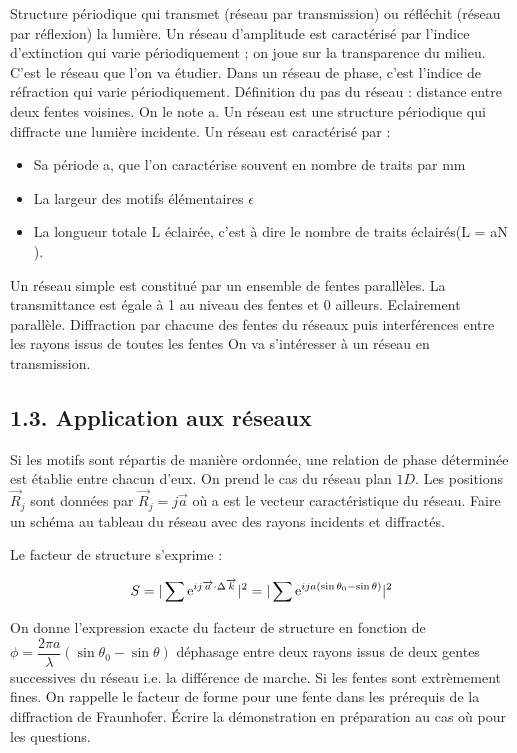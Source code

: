 \documentclass[french, a4paper, 10pt, twocolumn, landscape]{article}
\begin{document}
Structure périodique qui transmet (réseau par
transmission) ou réfléchit (réseau par réflexion) la lumière.
Un réseau d'amplitude est caractérisé par l'indice d'extinction qui varie
périodiquement ; on joue sur la transparence du milieu. C'est le réseau que
l'on va étudier. Dans un réseau de phase, c'est l'indice de réfraction qui
varie périodiquement.
Définition du pas du réseau : distance entre deux fentes voisines. On le
note a. Un réseau est une structure périodique qui diffracte une lumière incidente. Un réseau est caractérisé par :
\begin{itemize}

\item Sa période a, que l'on caractérise souvent en nombre de traits par mm
\item La largeur des motifs élémentaires $\epsilon$
\item La longueur totale L éclairée, c'est à dire le nombre de traits éclairés(L = aN ).
\end{itemize}

Un réseau simple est constitué par un ensemble de fentes parallèles. La
transmittance est égale à 1 au niveau des fentes et 0 ailleurs.
Eclairement parallèle. Diffraction par chacune des fentes du réseaux puis
interférences entre les rayons issus de toutes les fentes
On va s'intéresser à un réseau en transmission.

\subsection*{1.3. Application aux réseaux}

Si les motifs sont répartis de manière ordonnée, une relation de phase déterminée est établie entre chacun d'eux. On prend le cas du réseau plan $1D$. Les positions $\vec{R}_j$ sont données par $\vec{R}_j=j\vec{a}$ où a est le vecteur caractéristique du réseau. Faire un schéma au tableau du réseau avec des rayons incidents et diffractés.

Le facteur de structure s'exprime :

\begin{equation}
    S = |\sum {\rm e}^{ij\vec{a}\cdot \Delta\vec{k}}|^2 = |\sum {\rm e}^{ija(\sin\theta_0-\sin\theta)}|^2
\end{equation}

On donne l'expression exacte du facteur de structure en fonction de $\phi = \dfrac{2\pi a}{\lambda}(\sin\theta_0-\sin\theta)$ déphasage entre deux rayons issus de deux gentes successives du réseau i.e. la différence de marche. 
Si les fentes sont extrèmement fines. On rappelle le facteur de forme pour une fente dans les prérequis de la diffraction de Fraunhofer. Écrire la démonstration en préparation au cas où pour les questions.
\end{document}
